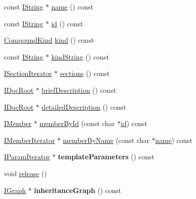 \begin{DoxyCompactItemize}
\item 
const \hyperlink{class_i_string}{I\-String} $\ast$ \hyperlink{class_compound_handler_abc1b3c24a1bf7f630dd7790258ce3826}{name} () const 
\item 
const \hyperlink{class_i_string}{I\-String} $\ast$ \hyperlink{class_compound_handler_a7ee3d1471e529e5d04316a403f65f410}{id} () const 
\item 
\hyperlink{class_i_compound_a7063885b1cabbff5f94849960f08ecb2}{Compound\-Kind} \hyperlink{class_compound_handler_a3d58bcf4b8672eff9a550ab75b4bb17a}{kind} () const 
\item 
const \hyperlink{class_i_string}{I\-String} $\ast$ \hyperlink{class_compound_handler_afb533b27130d10febf3477338c90f1e4}{kind\-String} () const 
\item 
\hyperlink{class_i_section_iterator}{I\-Section\-Iterator} $\ast$ \hyperlink{class_compound_handler_aa53a8319489c6f3a03806ae14f5d78cf}{sections} () const 
\item 
\hyperlink{class_i_doc_root}{I\-Doc\-Root} $\ast$ \hyperlink{class_compound_handler_a90d0ec3bda5465dfb8c7b986c9bc2f1f}{brief\-Description} () const 
\item 
\hyperlink{class_i_doc_root}{I\-Doc\-Root} $\ast$ \hyperlink{class_compound_handler_a125deb50c49081b484e9a688e73382fe}{detailed\-Description} () const 
\item 
\hyperlink{class_i_member}{I\-Member} $\ast$ \hyperlink{class_compound_handler_abf35727fa0ef6d77c1768e90830186c4}{member\-By\-Id} (const char $\ast$\hyperlink{class_compound_handler_a7ee3d1471e529e5d04316a403f65f410}{id}) const 
\item 
\hyperlink{class_i_member_iterator}{I\-Member\-Iterator} $\ast$ \hyperlink{class_compound_handler_ae712b1ed3a3cf5cd2d70c0a7a8a381e6}{member\-By\-Name} (const char $\ast$\hyperlink{class_compound_handler_abc1b3c24a1bf7f630dd7790258ce3826}{name}) const 
\item 
\hypertarget{class_compound_handler_ade1cc5a0e97b9e483b009225b43e1d99}{\hyperlink{class_i_param_iterator}{I\-Param\-Iterator} $\ast$ {\bfseries template\-Parameters} () const }\label{class_compound_handler_ade1cc5a0e97b9e483b009225b43e1d99}

\item 
void \hyperlink{class_compound_handler_a23b477d0e2d399f75d585d154c346591}{release} ()
\item 
\hypertarget{class_compound_handler_a5c8bb9921e759357498282c793695189}{\hyperlink{class_i_graph}{I\-Graph} $\ast$ {\bfseries inheritance\-Graph} () const }\label{class_compound_handler_a5c8bb9921e759357498282c793695189}


\end{DoxyCompactItemize}
